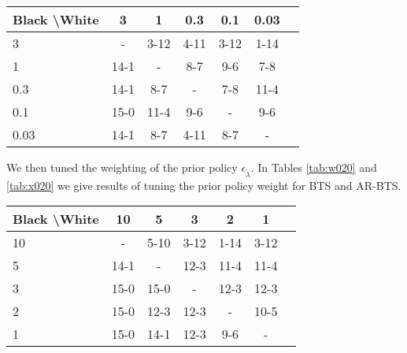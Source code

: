     \begin{table*}[]
    \centering
        \begin{tabular}{l|cccccc}
            \textbf{Black \textbackslash White}     & 3  & 1   & 0.3   & 0.1    & 0.03    \\ 
            \hline
                                    3            & -     & 3-12  & 4-11  & 3-12  & 1-14  \\
                                    1             & 14-1  & -     & 8-7  & 9-6  & 7-8  \\
                                    0.3             & 14-1   & 8-7   &   -   & 7-8  & 11-4  \\
                                    0.1              & 15-0  & 11-4  & 9-6  & -     & 9-6  \\
                                    0.03              & 14-1  & 8-7  & 4-11  & 8-7  &   -   \\    
        \end{tabular}
        \caption{Results for round robin to select the temperature parameter $\alpha_{\text{init}}$ for AR-BTS. The value of 0.1 won all four of its matches so was selected. \label{tab:x001}}
    \end{table*}
    
    
    
    
    
    
    We then tuned the weighting of the prior policy $\epsilon_{\tilde{\lambda}}$. In Tables \ref{tab:w020} and \ref{tab:x020} we give results of tuning the prior policy weight for BTS and AR-BTS.
    
    \begin{table*}[]
    \centering
        \begin{tabular}{l|cccccc}
            \textbf{Black \textbackslash White}     & 10  & 5   & 3   & 2    & 1    \\ 
            \hline
                                    10            & - & 5-10 & 3-12 & 1-14 &  3-12  		\\
                                    5            & 14-1 & - & 12-3 & 11-4 & 11-4   		\\
                                    3          & 15-0 & 15-0 & - & 12-3 & 12-3   		\\
                                    2          & 15-0 & 12-3 & 12-3 & - & 10-5   		\\
                                    1         & 15-0 & 14-1 & 12-3 & 9-6 &   -   	\\    
        \end{tabular}
        \caption{Results for round robin to select the weighting of the prior policy $\epsilon_{\tilde{\lambda}}$ for BTS. The value of 2.0 won the most matches so was selected. \label{tab:w020}}
    \end{table*}
    
